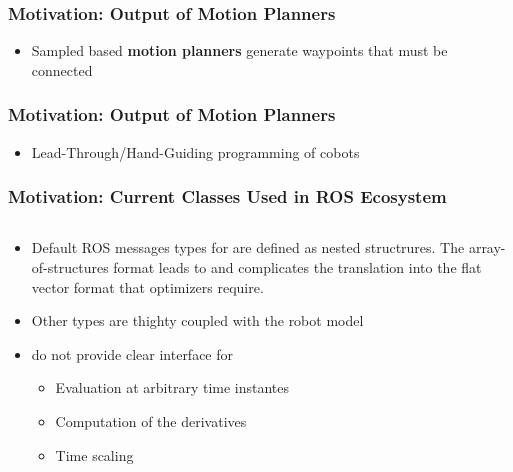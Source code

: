 \begin{frame}[t]
	\frametitle{Motivation: Output of Motion Planners}
	\begin{itemize}
		\item Sampled based \textbf{motion planners} generate waypoints that must be connected
	\end{itemize}
\end{frame}
\begin{frame}[t]
	\frametitle{Motivation: Output of Motion Planners}
	\begin{itemize}
		\item Lead-Through/Hand-Guiding programming of cobots
	\end{itemize}
\end{frame}

\begin{frame}[fragile]
	\frametitle{Motivation: Current Classes Used in ROS Ecosystem}
	\begin{columns}
		\begin{column}{0.5\textwidth}
			\begin{itemize}
				\item Default ROS messages types for are defined as nested structrures.
				      The array-of-structures format leads to  and complicates the translation into the flat vector format that optimizers require.
				\item Other types are thighty coupled with the robot model
				\item do not provide clear interface for
				      \begin{itemize}
					      \item Evaluation at arbitrary time instantes
					      \item Computation of the derivatives
					      \item Time scaling
				      \end{itemize}
			\end{itemize}


\end{column}
\end{columns}
\end{frame}
